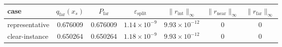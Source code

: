 \begin{tabular}{@{}lcccccc@{}}
\toprule
case & $q_{\mathrm{far}}(x_s)$ & $P_{\mathrm{far}}$ & $\varepsilon_{\mathrm{split}}$ & $\|r_{\mathrm{int}}\|_\infty$ & $\|r_{\mathrm{near}}\|_\infty$ & $\|r_{\mathrm{far}}\|_\infty$ \\
\midrule
representative & 0.676009 & 0.676009 & $1.14\times 10^{-9}$ & $9.93\times 10^{-12}$ & $0$ & $0$ \\
clear-instance & 0.650264 & 0.650264 & $1.18\times 10^{-9}$ & $9.93\times 10^{-12}$ & $0$ & $0$ \\
\bottomrule
\end{tabular}
